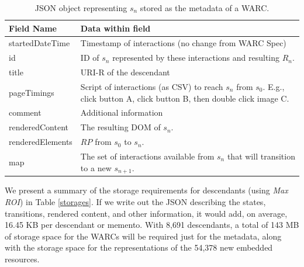 \documentclass{sig-alternate}
\begin{document}
\begin{table}
\centering
\begin{tabular}{l | p{5cm}}
\textbf{Field Name} & \textbf{Data within field} \\
\hline
\hline
startedDateTime & Timestamp of interactions (no change from WARC Spec)\\
\hline
id & ID of $s_n$ represented by these interactions and resulting $R_n$.\\
\hline
title & URI-R of the descendant\\
\hline
pageTimings & Script of interactions (as CSV) to reach $s_n$ from $s_0$. E.g., click button A, click button B, then double click image C.\\
\hline
comment & Additional information \\
\hline
renderedContent & The resulting DOM of $s_n$.\\
\hline
renderedElements & $RP$ from $s_0$ to $s_n$.\\
\hline
map & The set of interactions available from $s_n$ that will transition to a new $s_{n+1}$.\\
\hline
\end{tabular}
  \caption{JSON object representing $s_n$ stored as the metadata of a WARC.}
  \label{fields}
\end{table}


We present a summary of the storage requirements for descendants (using \emph{Max ROI}) in Table \ref{storages}. If we write out the JSON describing the states, transitions, rendered content, and other information, it would add, on average, 16.45 KB per descendant or memento. With 8,691 descendants, a total of 143 MB of storage space for the WARCs will be required just for the metadata, along with the storage space for the representations of the 54,378 new embedded resources. 
\end{document}
